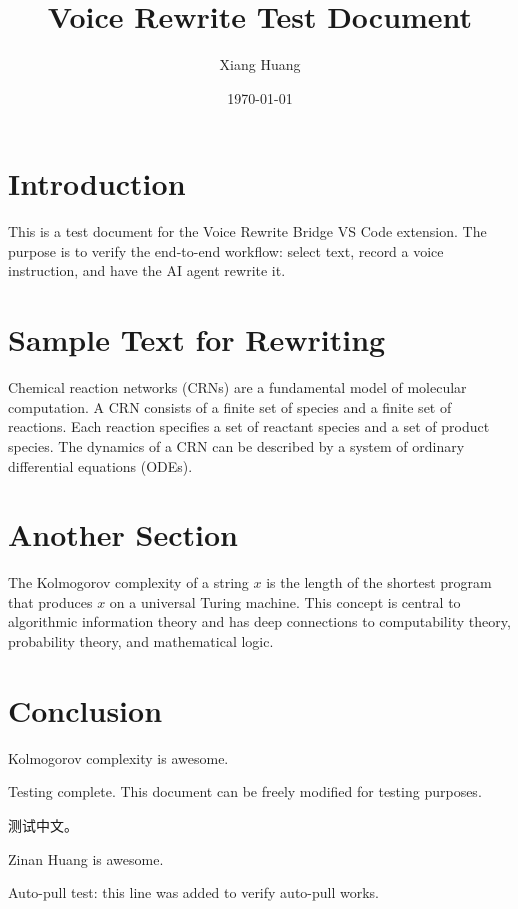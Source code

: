 \documentclass{article}
\title{Voice Rewrite Test Document}
\author{Xiang Huang}
\date{\today}
\begin{document}
\maketitle

\section{Introduction}

This is a test document for the Voice Rewrite Bridge VS Code extension.
The purpose is to verify the end-to-end workflow: select text, record a voice instruction, and have the AI agent rewrite it.

\section{Sample Text for Rewriting}

Chemical reaction networks (CRNs) are a fundamental model of molecular computation.
A CRN consists of a finite set of species and a finite set of reactions.
Each reaction specifies a set of reactant species and a set of product species.
The dynamics of a CRN can be described by a system of ordinary differential equations (ODEs).

\section{Another Section}

The Kolmogorov complexity of a string $x$ is the length of the shortest program that produces $x$ on a universal Turing machine.
This concept is central to algorithmic information theory and has deep connections to computability theory, probability theory, and mathematical logic.

\section{Conclusion}

Kolmogorov complexity is awesome.

Testing complete. This document can be freely modified for testing purposes.

测试中文。

Zinan Huang is awesome.

Auto-pull test: this line was added to verify auto-pull works.
\end{document}
